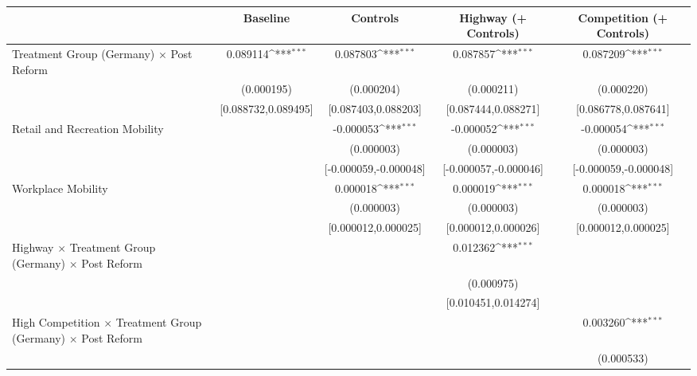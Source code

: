 {
\def\sym#1{\ifmmode^{#1}\else\(^{#1}\)\fi}
\begin{tabular}{l*{4}{c}}
\toprule
                    &\multicolumn{1}{c}{Baseline}&\multicolumn{1}{c}{Controls}&\multicolumn{1}{c}{Highway (+ Controls)}&\multicolumn{1}{c}{Competition (+ Controls)}\\
\midrule
Treatment Group (Germany) $\times$ Post Reform&    0.089114\sym{***}&    0.087803\sym{***}&    0.087857\sym{***}&    0.087209\sym{***}\\
                    &  (0.000195)         &  (0.000204)         &  (0.000211)         &  (0.000220)         \\
                    &[0.088732,0.089495]         &[0.087403,0.088203]         &[0.087444,0.088271]         &[0.086778,0.087641]         \\
Retail and Recreation Mobility&                     &   -0.000053\sym{***}&   -0.000052\sym{***}&   -0.000054\sym{***}\\
                    &                     &  (0.000003)         &  (0.000003)         &  (0.000003)         \\
                    &                     &[-0.000059,-0.000048]         &[-0.000057,-0.000046]         &[-0.000059,-0.000048]         \\
Workplace Mobility  &                     &    0.000018\sym{***}&    0.000019\sym{***}&    0.000018\sym{***}\\
                    &                     &  (0.000003)         &  (0.000003)         &  (0.000003)         \\
                    &                     &[0.000012,0.000025]         &[0.000012,0.000026]         &[0.000012,0.000025]         \\
Highway $\times$ Treatment Group (Germany) $\times$ Post Reform&                     &                     &    0.012362\sym{***}&                     \\
                    &                     &                     &  (0.000975)         &                     \\
                    &                     &                     &[0.010451,0.014274]         &                     \\
High Competition $\times$ Treatment Group (Germany) $\times$ Post Reform&                     &                     &                     &    0.003260\sym{***}\\
                    &                     &                     &                     &  (0.000533)         \\

\end{tabular}}
